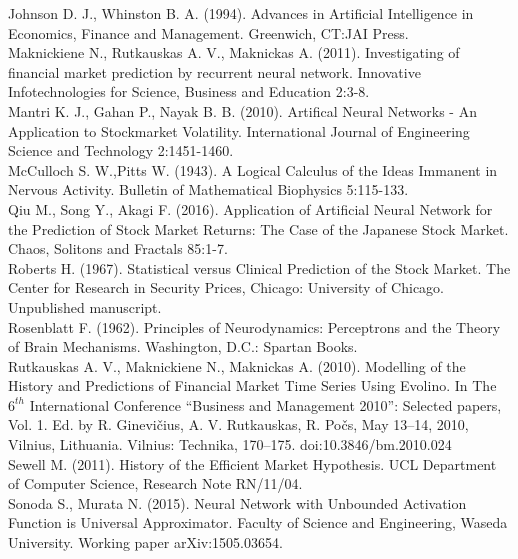 \documentclass[12pt, letterpaper]{amsart}%
\begin{document}
Johnson D. J., Whinston B. A. (1994). Advances in Artificial Intelligence in Economics, Finance and Management. Greenwich, CT:JAI Press.
\\

Maknickiene N., Rutkauskas A. V., Maknickas A. (2011). Investigating of financial market prediction by recurrent neural network. Innovative Infotechnologies for Science, Business and Education 2:3-8.
\\

Mantri K. J., Gahan P., Nayak B. B. (2010). Artifical Neural Networks - An Application to Stockmarket Volatility. International Journal of Engineering Science and Technology 2:1451-1460.
\\

McCulloch S. W.,Pitts W. (1943). A Logical Calculus of the Ideas Immanent in Nervous Activity. Bulletin of Mathematical Biophysics 5:115-133.
\\

Qiu M., Song Y., Akagi F. (2016). Application of Artificial Neural Network for the Prediction of Stock Market Returns: The Case of the Japanese Stock Market. Chaos, Solitons and Fractals 85:1-7.
\\

Roberts H. (1967). Statistical versus Clinical Prediction of the Stock Market. The Center for Research in Security Prices, Chicago: University of Chicago. Unpublished manuscript.
\\

Rosenblatt F. (1962). Principles of Neurodynamics: Perceptrons and the Theory of Brain Mechanisms. Washington, D.C.: Spartan Books.
\\

Rutkauskas A. V., Maknickiene N., Maknickas A. (2010). Modelling of the History and Predictions of Financial Market Time Series Using Evolino. In The $6^{th}$ International Conference “Business and Management 2010”: Selected papers, Vol. 1. Ed. by R. Ginevičius, A. V. Rutkauskas, R. Počs, May 13–14, 2010, Vilnius, Lithuania. Vilnius: Technika, 170–175. doi:10.3846/bm.2010.024
\\

Sewell M. (2011). History of the Efficient Market Hypothesis. UCL Department of Computer Science, Research Note RN/11/04.
\\

Sonoda S., Murata N. (2015). Neural Network with Unbounded Activation Function is Universal Approximator. Faculty of Science and Engineering, Waseda University. Working paper arXiv:1505.03654.
\end{document}
